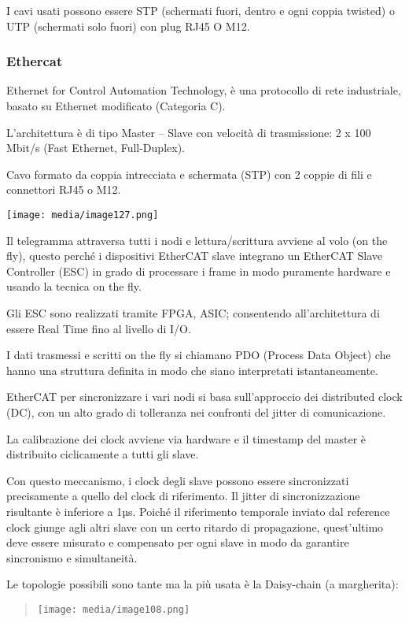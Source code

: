 I cavi usati possono essere STP (schermati fuori, dentro e ogni coppia
twisted) o UTP (schermati solo fuori) con plug RJ45 O M12.

\subsubsection{Ethercat}\label{ethercat}

Ethernet for Control Automation Technology, è una protocollo di rete
industriale, basato su Ethernet modificato (Categoria C).

L'architettura è di tipo Master -- Slave con velocità di trasmissione: 2
x 100 Mbit/s (Fast Ethernet, Full-Duplex).

Cavo formato da coppia intrecciata e schermata (STP) con 2 coppie di
fili e connettori RJ45 o M12.

\texttt{[image: media/image127.png]}

Il telegramma attraversa tutti i nodi e lettura/scrittura avviene al
volo (on the fly), questo perché i dispositivi EtherCAT slave integrano
un EtherCAT Slave Controller (ESC) in grado di processare i frame in
modo puramente hardware e usando la tecnica on the fly.

Gli ESC sono realizzati tramite FPGA, ASIC; consentendo all'architettura
di essere Real Time fino al livello di I/O.

I dati trasmessi e scritti on the fly si chiamano PDO (Process Data
Object) che hanno una struttura definita in modo che siano interpretati
istantaneamente.

EtherCAT per sincronizzare i vari nodi si basa sull'approccio dei
distributed clock (DC), con un alto grado di tolleranza nei confronti
del jitter di comunicazione.

La calibrazione dei clock avviene via hardware e il timestamp del master
è distribuito ciclicamente a tutti gli slave.

Con questo meccanismo, i clock degli slave possono essere sincronizzati
precisamente a quello del clock di riferimento. Il jitter di
sincronizzazione risultante è inferiore a 1µs. Poiché il riferimento
temporale inviato dal reference clock giunge agli altri slave con un
certo ritardo di propagazione, quest'ultimo deve essere misurato e
compensato per ogni slave in modo da garantire sincronismo e
simultaneità.

Le topologie possibili sono tante ma la più usata è la Daisy-chain (a
margherita):

\begin{quote}
\texttt{[image: media/image108.png]}
\end{quote}

